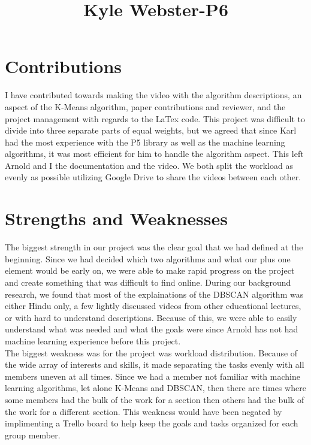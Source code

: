 \documentclass{article}
\title{Kyle Webster-P6}
\begin{document}
\maketitle

\section{Contributions}
I have contributed towards making the video with the algorithm descriptions, an aspect of the K-Means algorithm, paper contributions and reviewer,
and the project management with regards to the LaTex code. This project was difficult to divide into three separate parts of equal weights, but we
agreed that since Karl had the most experience with the P5 library as well as the machine learning algorithms, it was most efficient for him to
handle the algorithm aspect. This left Arnold and I the documentation and the video. We both split the workload as evenly as possible utilizing
Google Drive to share the videos between each other.

\section{Strengths and Weaknesses}
The biggest strength in our project was the clear goal that we had defined at the beginning. Since we had decided which two algorithms and what our
plus one element would be early on, we were able to make rapid progress on the project and create something that was difficult to find online.
During our background research, we found that most of the explainations of the DBSCAN algorithm was either Hindu only, a few lightly discussed videos
from other educational lectures, or with hard to understand descriptions. Because of this, we were able to easily understand what was needed
and what the goals were since Arnold has not had machine learning experience before this project.\\
The biggest weakness was for the project was workload distribution. Because of the wide array of interests and skills, it made separating the
tasks evenly with all members uneven at all times. Since we had a member not familiar with machine learning algorithms, let alone K-Means and DBSCAN,
then there are times where some members had the bulk of the work for a section then others had the bulk of the work for a different section.
This weakness would have been negated by implimenting a Trello board to help keep the goals and tasks organized for each group member.
\end{document}
